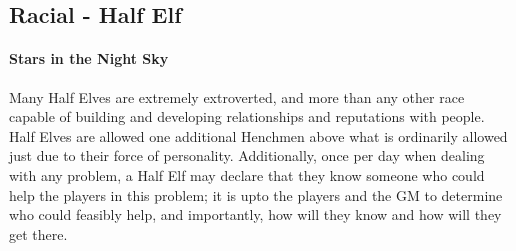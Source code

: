 \subsection{Racial - Half Elf} 
    \paragraph{Stars in the Night Sky} Many Half Elves are extremely extroverted, and more than any other race capable of building and developing relationships and reputations with people. Half Elves are allowed one additional Henchmen above what is ordinarily allowed just due to their force of personality. Additionally, once per day when dealing with any problem, a Half Elf may declare that they know someone who could help the players in this problem; it is upto the players and the GM to determine who could feasibly help, and importantly, how will they know and how will they get there. 